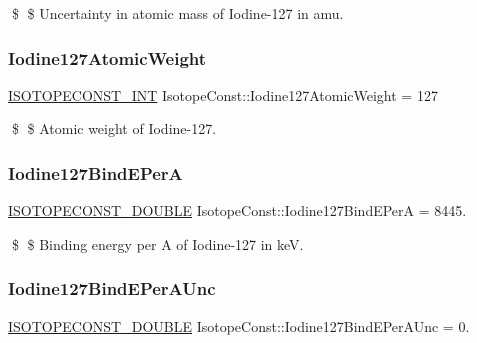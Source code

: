 \$ \$ Uncertainty in atomic mass of Iodine-\/127 in amu. \mbox{\label{group___isotope_const-_iodine-_i127_gabdfcc2697722b58fee2453478d475766}} 
\subsubsection{\texorpdfstring{Iodine127\+Atomic\+Weight}{Iodine127AtomicWeight}}
{\footnotesize\ttfamily \mbox{\hyperlink{group___isotope_const-_macros_ga5f18360b3e99483a35c32d789e62621c}{I\+S\+O\+T\+O\+P\+E\+C\+O\+N\+S\+T\+\_\+\+I\+NT}} Isotope\+Const\+::\+Iodine127\+Atomic\+Weight = 127}

\$ \$ Atomic weight of Iodine-\/127. \mbox{\label{group___isotope_const-_iodine-_i127_ga29e398580bee890918290196e88b6ef6}} 
\subsubsection{\texorpdfstring{Iodine127\+Bind\+E\+PerA}{Iodine127BindEPerA}}
{\footnotesize\ttfamily \mbox{\hyperlink{group___isotope_const-_macros_ga8f45a7272ce02c0b4c65c44636ed719a}{I\+S\+O\+T\+O\+P\+E\+C\+O\+N\+S\+T\+\_\+\+D\+O\+U\+B\+LE}} Isotope\+Const\+::\+Iodine127\+Bind\+E\+PerA = 8445.}

\$ \$ Binding energy per A of Iodine-\/127 in keV. \mbox{\label{group___isotope_const-_iodine-_i127_ga7d8219c143cc0606f844653488b6ebd1}} 
\subsubsection{\texorpdfstring{Iodine127\+Bind\+E\+Per\+A\+Unc}{Iodine127BindEPerAUnc}}
{\footnotesize\ttfamily \mbox{\hyperlink{group___isotope_const-_macros_ga8f45a7272ce02c0b4c65c44636ed719a}{I\+S\+O\+T\+O\+P\+E\+C\+O\+N\+S\+T\+\_\+\+D\+O\+U\+B\+LE}} Isotope\+Const\+::\+Iodine127\+Bind\+E\+Per\+A\+Unc = 0.}

